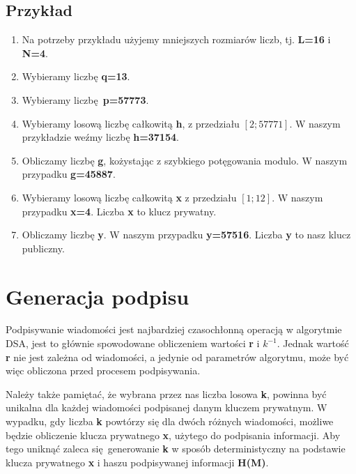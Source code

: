 \documentclass[11pt]{article}
\begin{document}
\subsection{Przykład}
\begin{enumerate}
  \item Na potrzeby przykładu użyjemy mniejszych rozmiarów liczb, tj.
    \textbf{L=16} i \textbf{N=4}.
  \item Wybieramy liczbę \textbf{q=13}.
  \item Wybieramy liczbę \textbf{p=57773}.
  \item Wybieramy losową liczbę całkowitą \textbf{h}, z przedziału $[2; 57771]$.
    W naszym przykładzie weźmy liczbę \textbf{h=37154}.
  \item Obliczamy liczbę \textbf{g}, kożystając z szybkiego potęgowania modulo.
    W naszym przypadku \textbf{g=45887}.
  \item Wybieramy losową liczbę całkowitą \textbf{x} z przedziału $[1; 12]$. W
    naszym przypadku \textbf{x=4}. Liczba \textbf{x} to klucz prywatny.
  \item Obliczamy liczbę \textbf{y}. W naszym przypadku \textbf{y=57516}. Liczba
    \textbf{y} to nasz klucz publiczny.
\end{enumerate}

\section{Generacja podpisu}
Podpisywanie wiadomości jest najbardziej czasochłonną operacją w algorytmie DSA,
jest to głównie spowodowane obliczeniem wartości \textbf{r} i \textbf{$k^{-1}$}.
Jednak wartość \textbf{r} nie jest zależna od wiadomości, a jedynie od
parametrów algorytmu, może być więc obliczona przed procesem podpisywania.

Należy także pamiętać, że wybrana przez nas liczba losowa \textbf{k}, powinna
być unikalna dla każdej wiadomości podpisanej danym kluczem prywatnym. W
wypadku, gdy liczba \textbf{k} powtórzy się dla dwóch różnych wiadomości,
możliwe będzie obliczenie klucza prywatnego \textbf{x}, użytego do podpisania
informacji. Aby tego uniknąć zaleca się generowanie \textbf{k} w sposób
deterministyczny na podstawie klucza prywatnego \textbf{x} i haszu podpisywanej
informacji \textbf{H(M)}.
\end{document}
